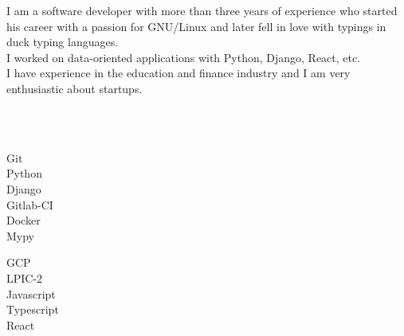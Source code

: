 \documentclass[9pt]{developercv}
\begin{document}
\begin{minipage}[t]{1\textwidth}
	\vspace{-\baselineskip}
	I am a software developer with more than three years of experience who started his career with a passion for GNU/Linux and later fell in love with typings in duck typing languages.\\
	I worked on data-oriented applications with Python, Django, React, etc. \\
	I have experience in the education and finance industry and I am very enthusiastic about startups.
\end{minipage}

\\\\
\begin{minipage}[t]{0.49\textwidth}
	\Large
	\vspace{-\baselineskip}

	\faCircle \; {Git}\\
	\faCircle \; {Python}\\
	\faCircle \; {Django}\\
	\faCircle \; {Gitlab-CI}\\
	\faCircle \; {Docker}\\
	\faCircle \; {Mypy}\\
\end{minipage}
\begin{minipage}[t]{0.50\textwidth}
	\Large
	\vspace{-\baselineskip}

	\faCircle \; {GCP}\\
	\faCircle \; {LPIC-2}\\
	\faCircle \; {Javascript}\\
	\faCircle \; {Typescript}\\
	\faCircle \; {React}\\
\end{minipage}
\end{document}
